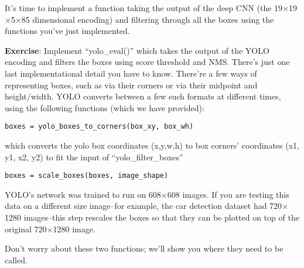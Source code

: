 
It's time to implement a function taking the output of the deep CNN (the 19$\times$19$\times$5$\times$85 dimensional encoding) and filtering through all the boxes using the functions you've just implemented. 

{\textbf{Exercise}}: Implement ``yolo\_eval()'' which takes the output of the YOLO encoding and filters the boxes using score threshold and NMS. There's just one last implementational detail you have to know. There're a few ways of representing boxes, such as via their corners or via their midpoint and height/width. YOLO converts between a few such formats at different times, using the following functions (which we have provided): 

\begin{verbatim}
boxes = yolo_boxes_to_corners(box_xy, box_wh) 
\end{verbatim}
which converts the yolo box coordinates (x,y,w,h) to box corners' coordinates (x1, y1, x2, y2) to fit the input of ``yolo\_filter\_boxes''
\begin{verbatim}
boxes = scale_boxes(boxes, image_shape)
\end{verbatim}
YOLO's network was trained to run on 608$\times$608 images. If you are testing this data on a different size image--for example, the car detection dataset had 720$\times$1280 images--this step rescales the boxes so that they can be plotted on top of the original 720$\times$1280 image.  

Don't worry about these two functions; we'll show you where they need to be called.  

